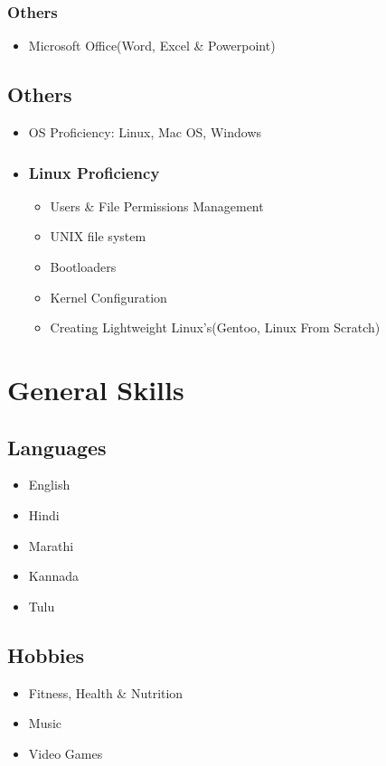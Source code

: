 \documentclass{article}
\begin{document}
			\subsubsection{Others}
				\begin{itemize}
					\item Microsoft Office(Word, Excel \& Powerpoint)
				\end{itemize}
		\subsection{Others}
			\begin{itemize}
				\item OS Proficiency: Linux, Mac OS, Windows
				\item \subsubsection{Linux Proficiency}
						\begin{itemize}
							\item Users \& File Permissions Management
							\item UNIX file system
							\item Bootloaders
							\item Kernel Configuration
							\item Creating Lightweight Linux's(Gentoo, Linux From Scratch)
						\end{itemize}
			\end{itemize}
	\section{General Skills}
		\subsection{Languages}
			\begin{itemize}
				\item English
				\item Hindi
				\item Marathi
				\item Kannada
				\item Tulu
			\end{itemize}
		\subsection{Hobbies}
			\begin{itemize}
				\item Fitness, Health \& Nutrition
				\item Music
				\item Video Games
			\end{itemize}
\end{document}
